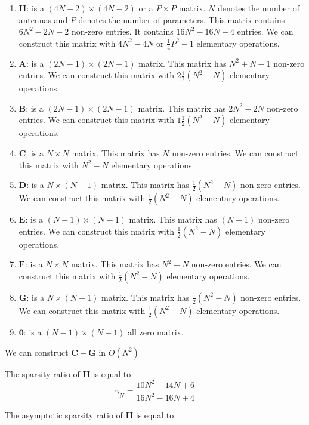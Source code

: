 \documentclass[a4paper,fleqn,usenatbib]{mnras}
\begin{document}
\begin{enumerate}
\item $\boldsymbol{H}$: is a $(4N-2)\times(4N-2)$ or a $P \times P$ matrix. $N$ denotes the number of antennas and $P$ denotes the number of parameters. This matrix
contains $6N^2 - 2N - 2$ non-zero entries. It contains $16N^2 - 16N + 4$ entries. We can construct this matrix with $4N^2 -  4N$ or $\frac{1}{4} P^2 -1$ elementary operations.
\item $\boldsymbol{A}$: is a $(2N-1)\times(2N-1)$ matrix. This matrix has $N^2 + N - 1$ non-zero entries. We can construct this matrix with $2\frac{1}{2} (N^2 -  N)$ elementary operations.  
\item $\boldsymbol{B}$: is a $(2N-1)\times(2N-1)$ matrix. This matrix has $2N^2 - 2N$ non-zero entries. We can construct this matrix with $1\frac{1}{2} (N^2 -  N)$ elementary operations.
\item $\boldsymbol{C}$: is a $N\times N$ matrix. This matrix has $N$ non-zero entries. We can construct this matrix with $N^2-N$ elementary operations.
\item $\boldsymbol{D}$: is a $N \times (N-1)$ matrix. This matrix has $\frac{1}{2} (N^2 -  N)$ non-zero entries. We can construct this matrix with $\frac{1}{2} (N^2 -  N)$ elementary operations. 
\item $\boldsymbol{E}$: is a $(N-1) \times (N-1)$ matrix. This matrix has $(N-1)$ non-zero entries. We can construct this matrix with $\frac{1}{2} (N^2 -  N)$ elementary operations.  
\item $\boldsymbol{F}$: is a $N \times N$ matrix. This matrix has $N^2 - N$ non-zero entries. We can construct this matrix with $\frac{1}{2} (N^2 -  N)$ elementary operations.
\item $\boldsymbol{G}$: is a $N \times (N-1)$ matrix. This matrix has $\frac{1}{2} (N^2 -  N)$ non-zero entries. We can construct this matrix with $\frac{1}{2} (N^2 -  N)$ elementary operations.
\item $\boldsymbol{0}$: is a $(N-1) \times (N-1)$ all zero matrix. 
\end{enumerate}

We can construct $\boldsymbol{C}-\boldsymbol{G}$ in $O(N^2)$ 


The sparsity ratio of $\boldsymbol{H}$ is equal to
\begin{equation}
\gamma_N = \frac{10N^2-14N+6}{16N^2-16N+4} 
\end{equation}

The asymptotic sparsity ratio of $\boldsymbol{H}$ is equal to
\end{document}
